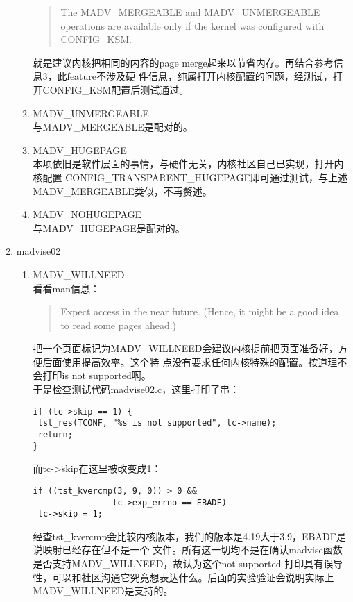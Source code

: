 \documentclass[scheme=plain]{ctexart}
\begin{document}
\begin{enumerate}
\begin{enumerate}
\begin{quotation}
      The MADV\_MERGEABLE and MADV\_UNMERGEABLE operations are available only if the kernel
      was configured with CONFIG\_KSM.
    \end{quotation}
    就是建议内核把相同的内容的page merge起来以节省内存。再结合参考信息3，此feature不涉及硬
    件信息，纯属打开内核配置的问题，经测试，打开CONFIG\_KSM配置后测试通过。
  \item MADV\_UNMERGEABLE\\
    与MADV\_MERGEABLE是配对的。
  \item MADV\_HUGEPAGE\\
    本项依旧是软件层面的事情，与硬件无关，内核社区自己已实现，打开内核配置
    CONFIG\_TRANSPARENT\_HUGEPAGE即可通过测试，与上述MADV\_MERGEABLE类似，不再赘述。
  \item MADV\_NOHUGEPAGE\\
    与MADV\_HUGEPAGE是配对的。
  \end{enumerate}
\item madvise02
  \begin{enumerate}
  \item MADV\_WILLNEED\\
    看看man信息：
    \begin{quote}
      Expect access in the near future.  (Hence, it might be a good idea to read some
      pages ahead.)
    \end{quote}

    把一个页面标记为MADV\_WILLNEED会建议内核提前把页面准备好，方便后面使用提高效率。这个特
    点没有要求任何内核特殊的配置。按道理不会打印is not supported啊。\\

    于是检查测试代码madvise02.c，这里打印了串：
\begin{verbatim}
if (tc->skip == 1) {
 tst_res(TCONF, "%s is not supported", tc->name);
 return;
}
\end{verbatim}
    而tc->skip在这里被改变成1：
\begin{verbatim}
if ((tst_kvercmp(3, 9, 0)) > 0 &&
				tc->exp_errno == EBADF)
 tc->skip = 1;
\end{verbatim}
    经查tst\_kvercmp会比较内核版本，我们的版本是4.19大于3.9，EBADF是说映射已经存在但不是一个
    文件。所有这一切均不是在确认madvise函数是否支持MADV\_WILLNEED，故认为这个not supported
    打印具有误导性，可以和社区沟通它究竟想表达什么。后面的实验验证会说明实际上
    MADV\_WILLNEED是支持的。
  \end{enumerate}
  

\end{enumerate}
\end{document}
